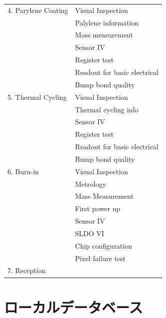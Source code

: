 \begin{table}[tbp]
\begin{center}
\begin{tabular}{|ll|}
    4. Parylene Coating     & Visual Inspection \\ 
                            & Palylene information \\
                            & Mass measurement \\
                            & Sensor IV \\
                            & Register test\\
                            & Readout for basic electrical \\
                            & Bump bond quality \\\hline

    5. Thermal Cycling      & Visual Inspection \\ 
                            & Thermal cycling info \\
                            & Sensor IV \\
                            & Register test\\
                            & Readout for basic electrical \\
                            & Bump bond quality \\\hline

    6. Burn-in              & Visual Inspection \\ 
                            & Metrology \\
                            & Mass Measurement \\
                            & First power up\\
                            & Sensor IV\\
                            & SLDO VI\\
                            & Chip configuration\\
                            & Pixel failure test\\\hline

    7. Reception            & \\\hline 
  \end{tabular}
\end{center}
\end{table}

\newpage

\section{ローカルデータベース}

